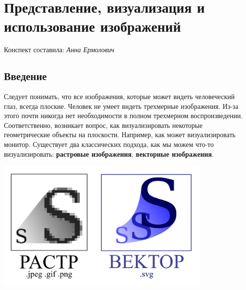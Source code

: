 \section{Представление, визуализация и использование изображений}
\begin{center}
    Конспект составила: \textit{Анна Ермолович}
\end{center}

\subsection{Введение}
Следует понимать, что все изображения, которые может видеть человеческий глаз, всегда плоские. Человек не умеет видеть трехмерные изображения. Из-за этого почти никогда нет необходимости в полном трехмерном воспроизведении. Соответственно, возникает вопрос, как визуализировать некоторые геометрические объекты на плоскости. Например, как может визуализировать монитор. Существует два классических подхода, как мы можем что-то визуализировать: \textbf{растровые изображения}, \textbf{векторные изображения}.
\begin{center}
    \includegraphics[width=0.8\textwidth]{r_v.PNG}

\end{center}

